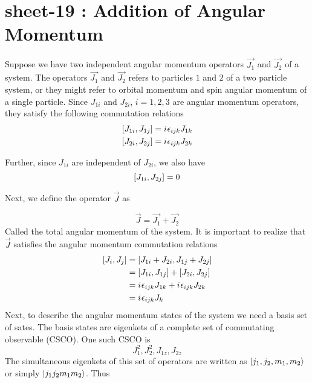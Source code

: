 

\chapter{sheet-19 : Addition of Angular Momentum}

\ifpdf
\graphicspath{{Chapter19/figs/}}
\else
\graphicspath{{Chapter19/figs/}}
\fi

Suppose we have two independent angular momentum operators $\vec{J_1}$ and $\vec{J_2}$ of a system. The operators $\vec{J_1}$ and $\vec{J_2}$ refers to particles $1$ and $2$ of a two particle system, or they might refer to orbital momentum and spin angular momentum of a single particle. Since $J_{1 i}$ and $J_{2 i}$, $i=1,2,3$ are angular momentum operators, they satisfy the following commutation relations
\begin{align}
\label{chapter19-eqn1}
\comm{J_{1 i}}{J_{1 j}} &= \iu \epsilon_{i j k} J_{1 k} \\
\label{chapter19-eqn2}
\comm{J_{2 i}}{J_{2 j}} &= \iu \epsilon_{i j k} J_{2 k}
\end{align}

Further, since $J_{1 i}$ are independent of $J_{2 i}$, we also have
\begin{equation}
\comm{J_{1 i}}{J_{2 j}} = 0
\end{equation}

Next, we define the operator $\vec{J}$ as

\begin{equation}
\vec{J} = \vec{J_1} + \vec{J_2}
\end{equation}
Called the total angular momentum of the system. It is important to realize that $\vec{J}$ satisfies the angular momentum commutation relations
\begin{align*}
\comm{J_i}{J_j} 
&= \comm{J_{1 i} + J_{2 i}}{J_{1 j} + J_{2 j}} \\
&= \comm{J_{1 i}}{J_{1 j}} + \comm{J_{2 i}}{J_{2 j}} \\
&= \iu \epsilon_{i j k} J_{1 k} + \iu \epsilon_{i j k} J_{2 k} \\
&= \iu \epsilon_{i j k} J_{k}
\end{align*}
Next, to describe the angular momentum states of the system we need a basis set of sates. The basis states are eigenkets of a complete set of commutating observable (CSCO). One such CSCO is
\begin{equation*}
J_1^2, J_2^2, J_{1 z}, J_{2 z}
\end{equation*}
The simultaneous eigenkets of this set of operators are written as $\ket{j_1,j_2,m_1,m_2}$ or simply $\ket{j_1 j_2 m_1 m_2}$. Thus


